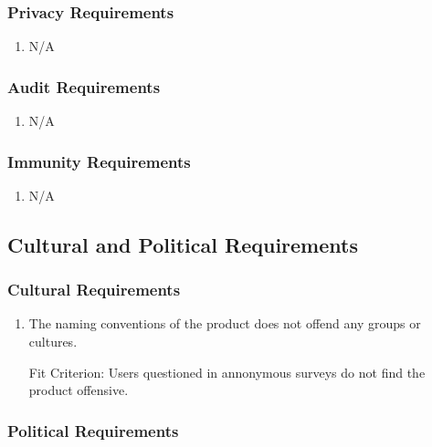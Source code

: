 \documentclass[12pt, titlepage]{article}
\begin{document}
\subsubsection{Privacy Requirements}

\begin{enumerate}[label=PRR\arabic*:, wide=0pt, leftmargin=*]
    \item N/A
\end{enumerate}

\subsubsection{Audit Requirements}

\begin{enumerate}[label=ADR\arabic*:, wide=0pt, leftmargin=*]
    \item N/A
\end{enumerate}

\subsubsection{Immunity Requirements}

\begin{enumerate}[label=IMR\arabic*:, wide=0pt, leftmargin=*]
    \item N/A
\end{enumerate}


\subsection{Cultural and Political Requirements}

\color{black}

\subsubsection{Cultural Requirements}
\begin{enumerate}[label=CR\arabic*:, wide=0pt, leftmargin=*]
    \item The naming conventions of the product does not offend any groups or cultures.
    \item [Fit Criterion:] Users questioned in annonymous surveys do not find the product offensive.
\end{enumerate}

\color{red}

\subsubsection{Political Requirements}
\end{document}
